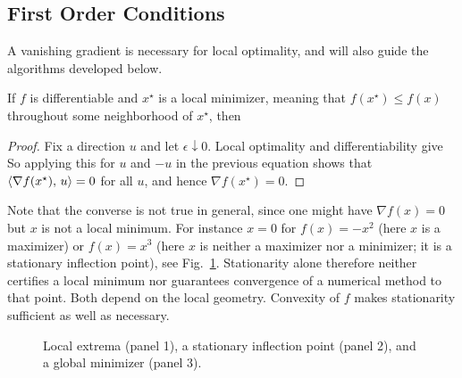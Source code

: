 \subsection{First Order Conditions}

A vanishing gradient is necessary for local optimality, and will also guide the algorithms developed below.

\begin{prop}\label{prop-cs-min} 
If $f$ is differentiable and $x^\star$ is a local minimizer, meaning that $f(x^\star)\leq f(x)$ throughout some neighborhood of $x^\star$, then
\end{prop}
\begin{proof}
Fix a direction $u$ and let $\epsilon\downarrow0$. Local optimality and differentiability give
So applying this for $u$ and $-u$ in the previous equation shows that $\langle \nabla f(x^\star),\,u\rangle=0$ for all $u$, and hence $\nabla f(x^\star)=0$.
\end{proof}

Note that the converse is not true in general, since one might have $\nabla f(x)=0$ but $x$ is not a local minimum. For instance $x=0$ for $f(x)=-x^2$ (here $x$ is a maximizer) or $f(x)=x^3$ (here $x$ is neither a maximizer nor a minimizer; it is a stationary inflection point), see Fig.~\ref{fig-first-order}.
%
Stationarity alone therefore neither certifies a local minimum nor guarantees convergence of a numerical method to that point. Both depend on the local geometry.
%
Convexity of $f$ makes stationarity sufficient as well as necessary.

\begin{figure}[tbp]
\centering
{}\hfill
{}\hfill
{}
\caption{Local extrema (panel 1), a stationary inflection point (panel 2), and a global minimizer (panel 3).}
\label{fig-first-order}
\end{figure}


